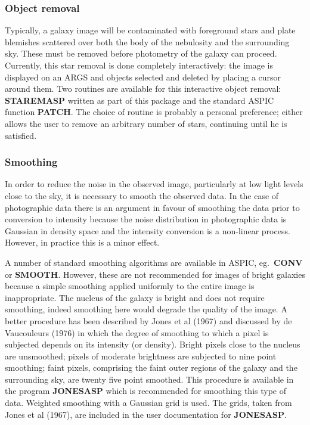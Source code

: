\subsubsection {Object removal}
Typically, a galaxy image will be contaminated with foreground stars and plate
blemishes scattered over both the body of the nebulosity and the surrounding
sky.
These must be removed before photometry of the galaxy can proceed.
Currently, this star removal is done completely interactively: the image is
displayed on an ARGS and objects selected and deleted by placing a cursor around
them.
Two routines are available for this interactive object removal: {\bf STAREMASP}
written as part of this package and the standard ASPIC function {\bf PATCH}.
The choice of routine is probably a personal preference; either allows the user
to remove an arbitrary number of stars, continuing until he is satisfied.
\subsubsection {Smoothing}
In order to reduce the noise in the observed image, particularly at low light
levels close to the sky, it is necessary to smooth the observed data.
In the case of photographic data there is an argument in favour of smoothing
the data prior to conversion to intensity because the noise distribution in
photographic data is Gaussian in density space and the intensity conversion is
a non-linear process.
However, in practice this is a minor effect.

A number of standard smoothing algorithms are available in ASPIC, eg.\
{\bf CONV} or {\bf SMOOTH}.
However, these are not recommended for images of bright galaxies because a
simple smoothing applied uniformly to the entire image is inappropriate.
The nucleus of the galaxy is bright and does not require smoothing, indeed
smoothing here would degrade the quality of the image.
A better procedure has been described by Jones et al (1967) and discussed by
de Vaucouleurs (1976) in which the degree of smoothing to which a pixel is
subjected depends on its intensity (or density).
Bright pixels close to the nucleus are unsmoothed; pixels of moderate brightness
are subjected to nine point smoothing; faint pixels, comprising the faint
outer regions of the galaxy and the surrounding sky, are twenty five point
smoothed.
This procedure is available in the program {\bf JONESASP} which is recommended
for smoothing this type of data.
Weighted smoothing with a Gaussian grid is used.
The grids, taken from Jones et al (1967), are included in the user documentation
for {\bf JONESASP}.
